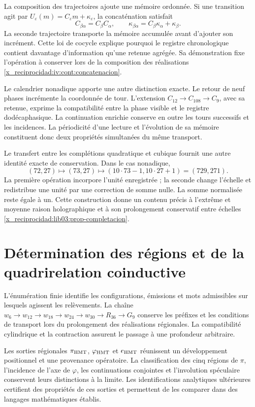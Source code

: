 La composition des trajectoires ajoute une mémoire ordonnée. Si une transition agit par \(U_\varepsilon(m)=C_\varepsilon m+
\kappa_\varepsilon\), la concaténation satisfait
\[
 C_{\beta\alpha}=C_\beta C_\alpha,
 \qquad
 \kappa_{\beta\alpha}=C_\beta\kappa_\alpha+
 \kappa_\beta.
\]
La seconde trajectoire transporte la mémoire accumulée avant d’ajouter son incrément. Cette loi de cocycle explique pourquoi le registre chronologique contient davantage d’information qu’une retenue agrégée. Sa démonstration fixe l’opération à conserver lors de la composition des réalisations \ref{x_reciprocidad:iv:cont:concatenacion}.

Le calendrier nonadique apporte une autre distinction exacte. Le retour de neuf phases incrémente la coordonnée de tour. L’extension \(C_{12}\to C_{108}\to C_9\), avec sa retenue, exprime la compatibilité entre la phase visible et le registre dodécaphasique. La continuation enrichie conserve en outre les tours successifs et les incidences. La périodicité d’une lecture et l’évolution de sa mémoire constituent donc deux propriétés simultanées du même transport.

Le transfert entre les complétions quadratique et cubique fournit une autre identité exacte de conservation. Dans le cas nonadique,
\[
 (72,27)\longmapsto(73,27)
 \longmapsto(10\cdot73-1,10\cdot27+1)=(729,271).
\]
La première opération incorpore l’unité enregistrée ; la seconde change l’échelle et redistribue une unité par une correction de somme nulle. La somme normalisée reste égale à un. Cette construction donne un contenu précis à l’extrême et moyenne raison holographique et à son prolongement conservatif entre échelles \ref{x_reciprocidad:lib03:prop-completacion}.

\section{Détermination des régions et de la quadrirelation coinductive}

L’énumération finie identifie les configurations, émissions et mots admissibles sur lesquels agissent les relèvements. La chaîne \(w_6\to w_{12}\to w_{18}\to w_{24}\to w_{30}\to R_{36}\to G_9\) conserve les préfixes et les conditions de transport lors du prolongement des réalisations régionales. La compatibilité cylindrique et la contraction assurent le passage à une profondeur arbitraire.

Les sorties régionales \(\pi_{\rm HMT}\), \(\varphi_{\rm HMT}\) et \(e_{\rm HMT}\) réunissent un développement positionnel et une provenance opératoire. La classification des cinq régions de \(\pi\), l’incidence de l’axe de \(\varphi\), les continuations conjointes et l’involution spéculaire conservent leurs distinctions à la limite. Les identifications analytiques ultérieures certifient des propriétés de ces sorties et permettent de les comparer dans des langages mathématiques établis.

